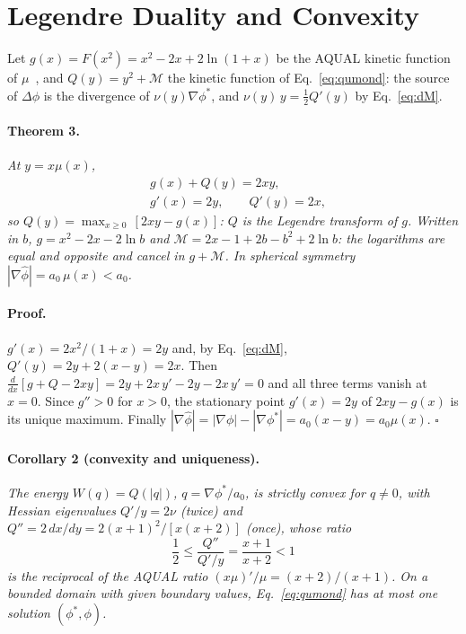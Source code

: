 \documentclass[twocolumn]{iopjournal}
\begin{document}

\section*{Legendre Duality and Convexity}

Let $g(x) = F(x^2) = x^2 - 2x + 2\ln(1+x)$ be the AQUAL kinetic
function of $\mu$~\cite{AqualProof}, and $Q(y) = y^2 + \mathcal{M}$
the kinetic function of Eq.~\eqref{eq:qumond}: the source of
$\Delta\phi$ is the divergence of $\nu(y)\nabla\phi^*$, and
$\nu(y)\,y = \tfrac12 Q'(y)$ by Eq.~\eqref{eq:dM}.

\paragraph{Theorem 3.} \textit{At $y = x\mu(x)$,}
\begin{equation}
\begin{aligned}
  &\boxed{g(x) + Q(y) = 2xy,}\\
  &g'(x) = 2y,\qquad Q'(y) = 2x,
\end{aligned}
  \label{eq:legendre}
\end{equation}
\textit{so $Q(y) = \max_{x \ge 0}\,[2xy - g(x)]$: $Q$ is the Legendre
transform of $g$. Written in $b$,
$g = x^2 - 2x - 2\ln b$ and $\mathcal{M} = 2x - 1 + 2b - b^2 + 2\ln b$:
the logarithms are equal and opposite and cancel in $g + \mathcal{M}$.
In spherical symmetry $|\nabla\hat\phi| = a_0\,\mu(x) < a_0$.}

\paragraph{Proof.} $g'(x) = 2x^2/(1+x) = 2y$ and, by
Eq.~\eqref{eq:dM}, $Q'(y) = 2y + 2(x - y) = 2x$. Then
$\frac{d}{dx}[g + Q - 2xy] = 2y + 2x\,y' - 2y - 2x\,y' = 0$ and all
three terms vanish at $x = 0$. Since $g'' > 0$ for $x > 0$, the
stationary point $g'(x) = 2y$ of $2xy - g(x)$ is its unique maximum.
Finally $|\nabla\hat\phi| = |\nabla\phi| - |\nabla\phi^*| =
a_0(x - y) = a_0\mu(x)$. \hfill $\square$

\paragraph{Corollary 2 (convexity and uniqueness).} \textit{The energy
$W(q) = Q(|q|)$, $q = \nabla\phi^*/a_0$, is strictly convex for
$q \neq 0$, with Hessian eigenvalues $Q'/y = 2\nu$ (twice) and
$Q'' = 2\,dx/dy = 2(x+1)^2/[x(x+2)]$ (once), whose ratio}
\begin{equation}
  \frac12 \le \frac{Q''}{Q'/y} = \frac{x+1}{x+2} < 1
  \label{eq:ratio}
\end{equation}
\textit{is the reciprocal of the AQUAL ratio $(x\mu)'/\mu =
(x+2)/(x+1)$. On a bounded domain with given boundary values,
Eq.~\eqref{eq:qumond} has at most one solution $(\phi^*, \phi)$.}
\end{document}
